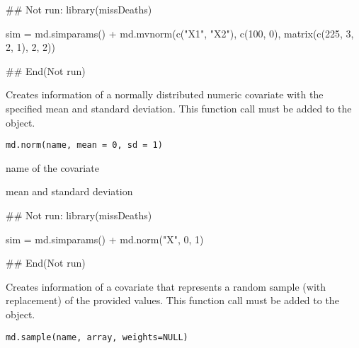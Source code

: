 \documentclass[a4paper]{book}
\begin{document}
%
\begin{Examples}
\begin{ExampleCode}

## Not run: 
library(missDeaths)

sim = md.simparams() +
   md.mvnorm(c("X1", "X2"), c(100, 0), matrix(c(225, 3, 2, 1), 2, 2))

## End(Not run)
\end{ExampleCode}
\end{Examples}
%
\begin{Description}\relax
Creates information of a normally distributed numeric covariate with the specified mean and standard deviation.
This function call must be added to the  object.
\end{Description}
%
\begin{Usage}
\begin{verbatim}
md.norm(name, mean = 0, sd = 1)
\end{verbatim}
\end{Usage}
%
\begin{Arguments}
\begin{ldescription}
\item[\code{name}] name of the covariate

\item[\code{mean, sd}] mean and standard deviation
\end{ldescription}
\end{Arguments}
%
\begin{Examples}
\begin{ExampleCode}

## Not run: 
library(missDeaths)

sim = md.simparams() +
   md.norm("X", 0, 1) 

## End(Not run)

\end{ExampleCode}
\end{Examples}
%
\begin{Description}\relax
Creates information of a covariate that represents a random sample (with replacement) of the provided values.
This function call must be added to the  object.
\end{Description}
%
\begin{Usage}
\begin{verbatim}
md.sample(name, array, weights=NULL)
\end{verbatim}
\end{Usage}
\end{document}
